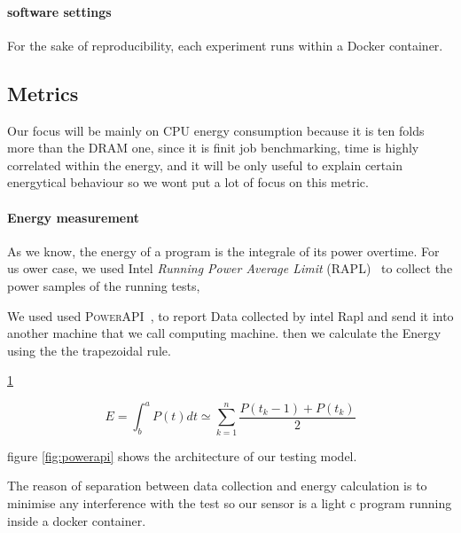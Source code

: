 \paragraph{software settings}
For the sake of reproducibility, each experiment runs within a Docker container.
\subsection{Metrics}
Our focus will be mainly on CPU energy consumption because it is ten folds more than the DRAM one, since it is finit job benchmarking, time is highly correlated within the energy, and it will be only useful to explain certain energytical behaviour so we wont put a lot of focus on this metric.



\paragraph{Energy measurement}

As we know, the energy of a program is the integrale of its power overtime. For us ower case, we used Intel \emph{Running Power Average Limit} (RAPL)~\cite{Khan:2018:RAE:3199681.3177754} to collect the power samples of the running tests,

We used used \textsc{PowerAPI}~\cite{DBLP:journals/jss/ColmantRKSFS18}, to report Data collected by intel Rapl and send it into another machine that we call computing machine. then we calculate the Energy using  the the trapezoidal rule.


\ref{fig:trapezrule}
\begin{figure}[hbt]
    \centering
    \begin{equation}
        E = \int^a_b P(t)dt \simeq \sum^n_{k=1} \frac{P(t_k-1)+P(t_k)}{2}
    \end{equation}
    \caption{}
    \label{fig:trapezrule}
\end{figure}



figure \ref{fig:powerapi} shows the architecture of our testing model.

The reason of separation between data collection and energy calculation is to minimise any interference with the test so our sensor is a light c program running inside a docker container.

